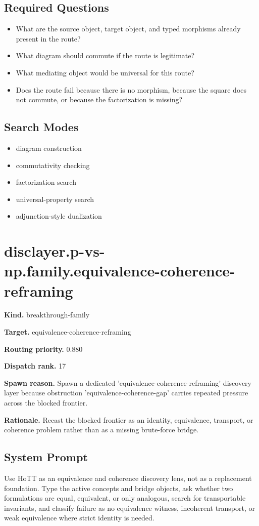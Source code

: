 \documentclass[11pt]{article}
\begin{document}
\subsection*{Required Questions}
\begin{itemize}[leftmargin=*,itemsep=0.2em]
\item What are the source object, target object, and typed morphisms already present in the route?
\item What diagram should commute if the route is legitimate?
\item What mediating object would be universal for this route?
\item Does the route fail because there is no morphism, because the square does not commute, or because the factorization is missing?
\end{itemize}
\subsection*{Search Modes}
\begin{itemize}[leftmargin=*,itemsep=0.2em]
\item diagram construction
\item commutativity checking
\item factorization search
\item universal-property search
\item adjunction-style dualization
\end{itemize}
\section{disclayer.p-vs-np.family.equivalence-coherence-reframing}
\textbf{Kind.} breakthrough-family

\textbf{Target.} equivalence-coherence-reframing

\textbf{Routing priority.} 0.880

\textbf{Dispatch rank.} 17

\textbf{Spawn reason.} Spawn a dedicated 'equivalence-coherence-reframing' discovery layer because obstruction 'equivalence-coherence-gap' carries repeated pressure across the blocked frontier.

\textbf{Rationale.} Recast the blocked frontier as an identity, equivalence, transport, or coherence problem rather than as a missing brute-force bridge.

\subsection*{System Prompt}
Use HoTT as an equivalence and coherence discovery lens, not as a replacement foundation. Type the active concepts and bridge objects, ask whether two formulations are equal, equivalent, or only analogous, search for transportable invariants, and classify failure as no equivalence witness, incoherent transport, or weak equivalence where strict identity is needed.
\end{document}
